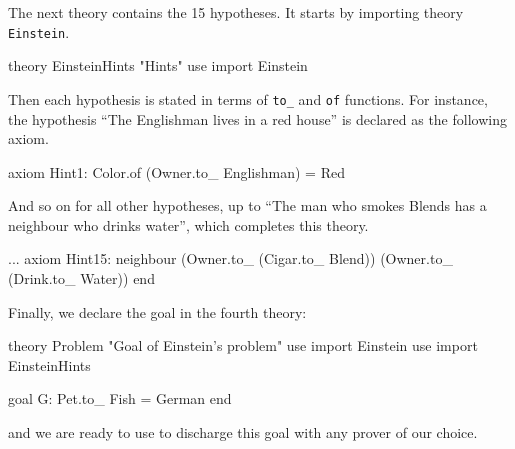 The next theory contains the 15 hypotheses. It starts by importing
theory \texttt{Einstein}.
\begin{whycode}
theory EinsteinHints "Hints"
  use import Einstein
\end{whycode}
Then each hypothesis is stated in terms of \texttt{to\_} and \texttt{of}
functions. For instance, the hypothesis ``The Englishman lives in a
red house'' is declared as the following axiom.
\begin{whycode}
  axiom Hint1: Color.of (Owner.to_ Englishman) = Red
\end{whycode}
And so on for all other hypotheses, up to
``The man who smokes Blends has a neighbour who drinks water'', which completes
this theory.
\begin{whycode}
  ...
  axiom Hint15:
    neighbour (Owner.to_ (Cigar.to_ Blend)) (Owner.to_ (Drink.to_ Water))
end
\end{whycode}
Finally, we declare the goal in the fourth theory:
\begin{whycode}
theory Problem "Goal of Einstein's problem"
  use import Einstein
  use import EinsteinHints

  goal G: Pet.to_ Fish = German
end
\end{whycode}
and we are ready to use \why to discharge this goal with any prover
of our choice.

